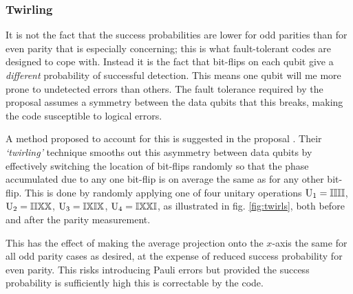 
\subsubsection{Twirling}

It is not the fact that the success probabilities are lower for odd parities than for even parity that is especially concerning; this is what fault-tolerant codes are designed to cope with. Instead it is the fact that bit-flips on each qubit give a \emph{different} probability of successful detection. This means one qubit will me more prone to undetected errors than others. The fault tolerance required by the proposal assumes a symmetry between the data qubits that this breaks, making the code susceptible to logical errors.

A method proposed to account for this is suggested in the proposal \cite{OGorman2016}. Their \emph{`twirling'} technique smooths out this asymmetry between data qubits by effectively switching the location of bit-flips randomly so that the phase accumulated due to any one bit-flip is on average the same as for any other bit-flip. This is done by randomly applying one of four unitary operations $\mathrm{U_1 = \mathbb{I}\mathbb{I}\mathbb{I}\mathbb{I}}$, $\mathrm{U_2 = \mathbb{I}\mathbb{I}\mathbb{X}\mathbb{X}}$, $\mathrm{U_3 = \mathbb{I}\mathbb{X}\mathbb{I}\mathbb{X}}$, $\mathrm{U_4 = \mathbb{I}\mathbb{X}\mathbb{X}\mathbb{I}}$, as illustrated in fig. \ref{fig:twirls}, both before and after the parity measurement.

This has the effect of making the average projection onto the $x$-axis the same for all odd parity cases as desired, at the expense of reduced success probability for even parity. This risks introducing Pauli errors \cite{OGorman2016} but provided the success probability is sufficiently high this is correctable by the code.


